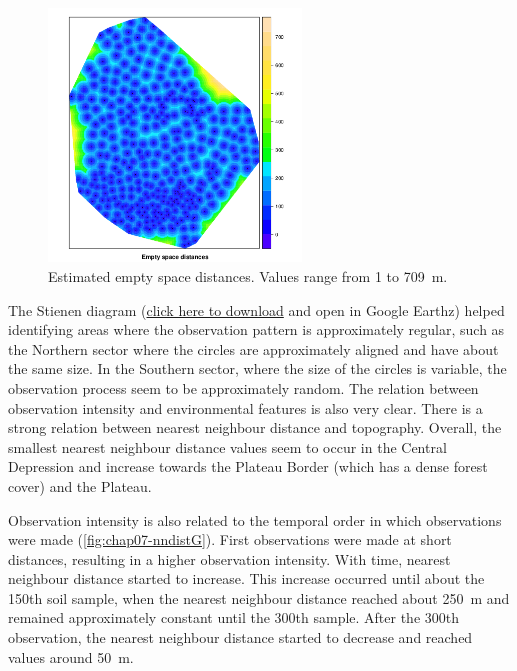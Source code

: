 \begin{figure}[!ht]
\centering
\includegraphics[width=0.6\textwidth]{fig/chap07-empty-space}
\caption[Estimated empty space distances.]{Estimated empty space distances. Values range from \num{1} to 
\SI{709}{\m}.}
\label{fig:chap07-intensity}
\end{figure}

The Stienen diagram (\href{https://www.dropbox.com/s/m00seobmpl5qtui/stienen.kml?dl=0}{click
here to download} and open in Google Earthz\rr{}) helped identifying areas where the observation 
pattern is 
approximately regular, such as the Northern sector where the circles are approximately aligned and have about 
the same size. In the Southern sector, where the size of the circles is variable, the observation process seem 
to be approximately random. The relation between observation intensity and environmental features is also very 
clear. There is a strong relation between nearest neighbour distance and topography. Overall, the smallest 
nearest neighbour distance values seem to occur in the Central Depression and increase towards the Plateau 
Border (which has a dense forest cover) and the Plateau.

Observation intensity is also related to the temporal order in which observations were made 
(\autoref{fig:chap07-nndistG}). First observations were made at short distances, resulting in a higher 
observation intensity. With time, nearest neighbour distance started to increase. This increase occurred until 
about the \num{150}th soil sample, when the nearest neighbour distance reached about \SI{250}{\m} and 
remained approximately constant until the \num{300}th sample. After the \num{300}th observation, the 
nearest neighbour distance started to decrease and reached values around \SI{50}{\m}.

